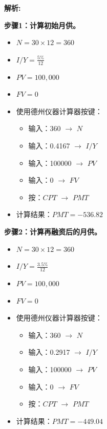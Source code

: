\documentclass{article}
\newenvironment{explanation}
{\textbf{解析:}\par}
{\par}
\begin{document}
                \begin{explanation}

                    \textbf{步骤1：计算初始月供。}
                    \begin{itemize}
                        \item \(N = 30 \times 12 = 360\)
                        \item \(I/Y = \frac{5\%}{12}\)
                        \item \(PV = 100,000\)
                        \item \(FV = 0\)
                        \item 使用德州仪器计算器按键：
                        \begin{itemize}
                            \item 输入：360 \(\to\) \(N\)
                            \item 输入：0.4167 \(\to\) \(I/Y\)
                            \item 输入：100000 \(\to\) \(PV\)
                            \item 输入：0 \(\to\) \(FV\)
                            \item 按：\(CPT\) \(\to\) \(PMT\)
                        \end{itemize}
                        \item 计算结果：\(PMT = -536.82\)
                    \end{itemize}
                    
                    \textbf{步骤2：计算再融资后的月供。}
                    \begin{itemize}
                        \item \(N = 30 \times 12 = 360\)
                        \item \(I/Y = \frac{3.5\%}{12}\)
                        \item \(PV = 100,000\)
                        \item \(FV = 0\)
                        \item 使用德州仪器计算器按键：
                        \begin{itemize}
                            \item 输入：360 \(\to\) \(N\)
                            \item 输入：0.2917 \(\to\) \(I/Y\)
                            \item 输入：100000 \(\to\) \(PV\)
                            \item 输入：0 \(\to\) \(FV\)
                            \item 按：\(CPT\) \(\to\) \(PMT\)
                        \end{itemize}
                        \item 计算结果：\(PMT = -449.04\)
                    \end{itemize}
                    

\end{explanation}
\end{document}
